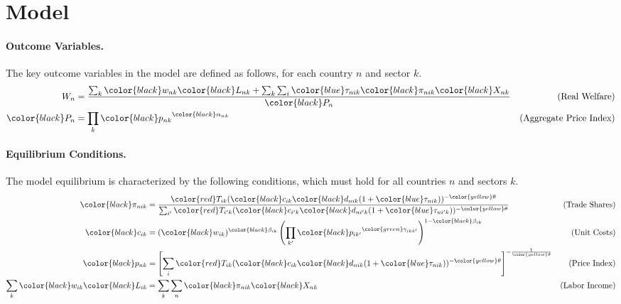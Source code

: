 \section{Model}
\paragraph{Outcome Variables.} The key outcome variables in the model are defined as follows, for each country $n$ and sector $k$.
\begin{align*}
    W_n &= \frac{\sum_{k} {\color{black}w_{nk}} {\color{black}L_{nk}} + \sum_{k} \sum_{i} {\color{blue}\tau_{nik}} {\color{black}\pi_{nik}} {\color{black}X_{nk}}}{{\color{black}P_n}} & \text{(Real Welfare)} \\
    {\color{black}P_n} &= \prod_{k} {\color{black}p_{nk}}^{{\color{black}\alpha_{nk}}} & \text{(Aggregate Price Index)}
\end{align*}

\paragraph{Equilibrium Conditions.} The model equilibrium is characterized by the following conditions, which must hold for all countries $n$ and sectors $k$.
\begin{align*}
    {\color{black}\pi_{nik}} &= \frac{{\color{red}T_{ik}} ({\color{black}c_{ik}} {\color{black}d_{nik}} (1 + {\color{blue}\tau_{nik}}))^{-{\color{yellow}\theta}}}{\sum_{i'} {\color{red}T_{i'k}} ({\color{black}c_{i'k}} {\color{black}d_{ni'k}} (1 + {\color{blue}\tau_{ni'k}}))^{-{\color{yellow}\theta}}} & \text{(Trade Shares)} \\
    {\color{black}c_{ik}} &= ({\color{black}w_{ik}})^{{\color{black}\beta_{ik}}} \left(\prod_{k'} {\color{black}p_{ik'}}^{{\color{green}\gamma_{ikk'}}}\right)^{1 - {\color{black}\beta_{ik}}} & \text{(Unit Costs)} \\
    {\color{black}p_{nk}} &= \left[ \sum_{i} {\color{red}T_{ik}} ({\color{black}c_{ik}} {\color{black}d_{nik}} (1 + {\color{blue}\tau_{nik}}))^{-{\color{yellow}\theta}} \right]^{-\frac{1}{{\color{yellow}\theta}}} & \text{(Price Index)} \\
   \sum_{k} {\color{black}w_{ik}} {\color{black}L_{ik}} &= \sum_{k} \sum_{n} {\color{black}\pi_{nik}} {\color{black}X_{nk}} & \text{(Labor Income)}
\end{align*}

